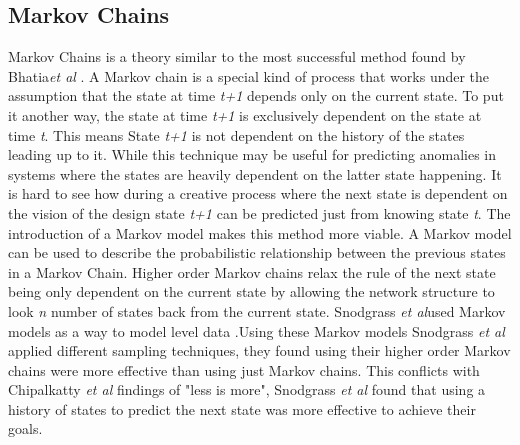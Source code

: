 \documentclass[journal]{IEEEtran}
\begin{document}
\subsection{Markov Chains}
Markov Chains is a theory similar to the most successful method found by Bhatia\textit{et al} \cite{bhatia2016targeted}. A Markov chain is a special kind of process that works under the assumption that the state at time \textit{t+1} depends only on the current state. To put it another way, the state at time \textit{t+1} is exclusively dependent on the state at time \textit{t}. This means State \textit{t+1}  is not dependent on the history of the states leading up to it\cite{ye2000markov}. While this technique may be useful for predicting anomalies in systems \cite{ju2001hybrid, gwadera2005markov, ye2000markov} where the states are heavily dependent on the latter state happening. It is hard to see how during a creative process where the next state is dependent on the vision of the design state \textit{t+1} can be predicted just from knowing state \textit{t}. The introduction of a Markov model makes this method more viable. A Markov model can be used to describe the probabilistic relationship between the previous states in a Markov Chain\cite{markov1971extension}.  Higher order Markov chains relax the rule of the next state being only dependent on the current state by allowing the network structure to look \textit{n} number of states back from the current state\cite{ching2008higher}. Snodgrass \textit{et al}\cite{snodgrass2017learning}used Markov models as a way to model level data  .Using these Markov models Snodgrass \textit{et al}\cite{snodgrass2017learning} applied different sampling techniques, they found using their higher order Markov chains were more effective than using just Markov chains.  This conflicts with Chipalkatty \textit{et al}\cite{chipalkatty2013less} findings of "less is more", Snodgrass \textit{et al}\cite{snodgrass2017learning} found that using a history of states to predict the next state was more effective to achieve their goals.
\end{document}
